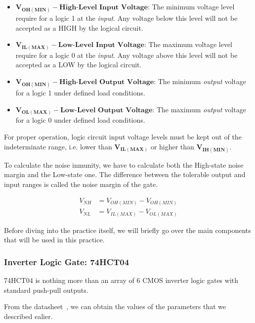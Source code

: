 \begin{itemize}
    \item $\mathbf{V_{OH (MIN)} - \text{High-Level Input Voltage}}$: The minimum voltage level require for a logic 1 at the \textit{input}. Any voltage below this level will not be accepted as a HIGH by the logical circuit. 

    \item $\mathbf{V_{IL (MAX)} - \text{Low-Level Input Voltage}}$: The maximum voltage level require for a logic 0 at the \textit{input}. Any voltage above this level will not be accepted as a LOW by the logical circuit. 

    \item $\mathbf{V_{OH (MIN)} - \text{High-Level Output Voltage}}$: The minimum \textit{output} voltage for a logic 1 under defined load conditions.

    \item $\mathbf{V_{OL (MAX)} - \text{Low-Level Output Voltage}}$: The maximum \textit{output} voltage for a logic 0 under defined load conditions.
\end{itemize}

For proper operation, logic circuit input voltage levels must be kept out of the indeterminate range, i.e. lower than $\mathbf{V_{IL (MAX)}}$ or higher than $\mathbf{V_{IH (MIN)}}$.\medskip

To calculate the noise inmunity, we have to calculate both the High-state noise margin and the Low-state one. The difference between the tolerable output and input ranges is called the noise margin of the gate. 

\begin{align*}
    V_{NH} &= V_{OH (MIN)} - V_{OH (MIN)} \\
    V_{NL} &= V_{IL (MAX)} - V_{OL (MAX)}
\end{align*}\medskip


Before diving into the practice itself, we will briefly go over the main components that will be used in this practice.

\subsubsection{Inverter Logic Gate: 74HCT04}

74HCT04 is nothing more than an array of 6 CMOS inverter logic gates with standard push-pull outputs. \medskip

From the datasheet~\autocite{74HCT04}, we can obtain the values of the parameters that we described ealier. 

